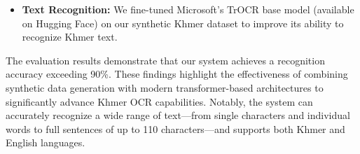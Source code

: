 \begin{adjustwidth}{0.2cm}{0.2cm}
\begin{itemize}[leftmargin=1.5em]
        \item \textbf{Text Recognition:} We fine-tuned Microsoft's TrOCR base model (available on Hugging Face) on our synthetic Khmer dataset to improve its ability to recognize Khmer text.
    \end{itemize}
    
    {\englishfont The evaluation results demonstrate that our system achieves a recognition accuracy exceeding 90\%. These findings highlight the effectiveness of combining synthetic data generation with modern transformer-based architectures to significantly advance Khmer OCR capabilities. Notably, the system can accurately recognize a wide range of text—from single characters and individual words to full sentences of up to 110 characters—and supports both Khmer and English languages.}


    
    \end{adjustwidth}